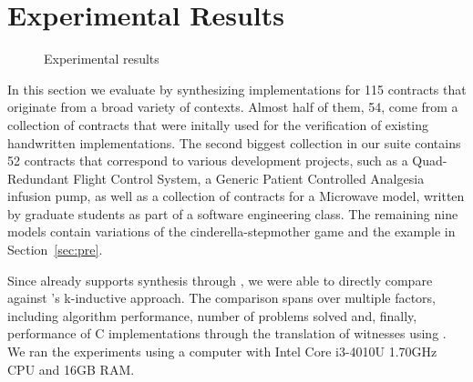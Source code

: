 \section{Experimental Results}
\label{sec:results}

\begin{figure*}[!t]
\centering
{}
\hfil
{}
\caption{Experimental results}
\label{fg:results}
\end{figure*}


In this section we evaluate \jsynvg by synthesizing implementations
for 115 contracts that originate from a broad variety of contexts. Almost half
of them, 54, come from a collection of contracts that were initally used for
the verification of existing handwritten implementations. The second
biggest collection in our suite contains 52 contracts that correspond to various
development projects, such as a Quad-Redundant Flight Control System, a Generic
Patient Controlled Analgesia infusion pump, as well as a collection of contracts
for a Microwave model, written by graduate students as part of a software
engineering class. The remaining nine models contain variations of the
cinderella-stepmother game and the example in Section~\ref{sec:pre}.

Since \jkind already supports synthesis through \jsyn, we were able to directly
compare \jsynvg against \jsyn's k-inductive approach.
The comparison spans over multiple factors, including
algorithm performance, number of problems solved and, finally, performance
of C implementations through the translation of witnesses using \smtlibtoc. We
ran the experiments using a computer with Intel Core i3-4010U 1.70GHz CPU and
16GB RAM.


